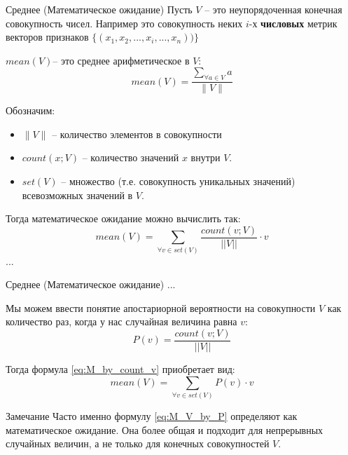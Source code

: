 \begin{frame}{Среднее (Математическое ожидание)}
	\footnotesize
	Пусть $V$ -- это неупорядоченная конечная совокупность чисел.
	Например это совокупность неких $i$-х \textbf{числовых} метрик векторов признаков $\{ (x_1, x_2, ..., x_i, ..., x_n))\}$
	
	 $mean(V)$-- это среднее арифметическое в $V$:
	\begin{equation}\label{eq:M}
	mean(V) = \frac{\sum_{\forall a \in V} a}{\lVert V \rVert}
	\end{equation}
	
	Обозначим:
	\begin{itemize}
		\item $ \lVert V \rVert$ -- количество элементов в совокупности
		\item $count(x;V)$ -- количество значений $x$ внутри $V$.
		\item $set(V)$ -- множество (т.е. совокупность уникальных значений) всевозможных значений в $V$.
	\end{itemize}
	
	Тогда математическое ожидание можно вычислить так:
	\begin{equation}\label{eq:M_by_count_v}
	mean(V) = \sum_{\forall v \in set(V)} \frac{count(v;V)}{||V||} \cdot v 
	\end{equation}
	...
\end{frame}

\begin{frame}{Среднее (Математическое ожидание)}
	\small
	...
	
	Мы можем ввести понятие апостариорной вероятности на совокупности $V$ как количество раз, когда 
	у нас случайная величина равна $v$:
	\begin{equation}
	P(v) = \frac{count(v;V)}{||V||}
	\end{equation}
	
	Тогда формула \eqref{eq:M_by_count_v} приобретает вид:
	\begin{equation}\label{eq:M_V_by_P}
	mean(V) = \sum_{\forall v \in set(V)} P(v) \cdot v
	\end{equation}
	
	\begin{block}{Замечание}
		Часто именно формулу \eqref{eq:M_V_by_P} определяют как 
		математическое ожидание. Она более общая и подходит для непрерывных случайных величин, 
		а не только для конечных совокупностей $V$.
	\end{block}	
\end{frame}


